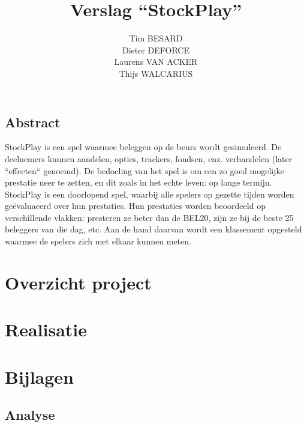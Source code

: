 \documentclass[a4paper,oneside,final]{memoir}
\title{Verslag ``StockPlay''}
\author{
Tim BESARD\\
Dieter DEFORCE\\
Laurens VAN ACKER\\
Thijs WALCARIUS
}
\begin{document}
\maketitle
{}
\tableofcontents
{}


%
%

\chapter*{Abstract}
StockPlay is een spel waarmee beleggen op de beurs wordt gesimuleerd. De deelnemers kunnen aandelen, opties, trackers, fondsen, enz. verhandelen (later ``effecten`` genoemd). De bedoeling van het spel is om een zo goed mogelijke prestatie neer te zetten, en dit zoals in het echte leven: op lange termijn. StockPlay is een doorlopend spel, waarbij alle spelers op gezette tijden worden ge\"evaluaeerd over hun prestaties. Hun prestaties worden beoordeeld op verschillende vlakken: presteren ze beter dan de BEL20, zijn ze bij de beste 25 beleggers van die dag, etc. Aan de hand daarvan wordt een klassement opgesteld waarmee de spelers zich met elkaar kunnen meten.

\part{Overzicht project}
\label{pt:overzicht}


\part{Realisatie}
\label{pt:realisatie}


%

%
%

\part{Bijlagen}
\label{pt:bijlagen}
\appendix
\chapter{Analyse}
\label{pt:analyse}


\end{document}
